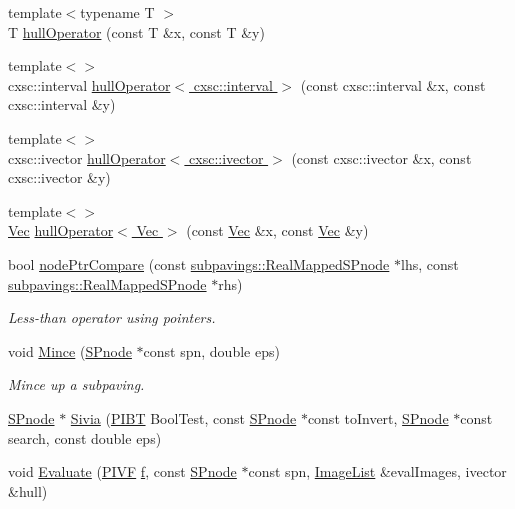 \begin{DoxyCompactItemize}
{\footnotesize template$<$typename T $>$ }\\\-T \hyperlink{namespacesubpavings_a3aaa0e2846fcc501bf57373ab4fcfcb3}{hull\-Operator} (const \-T \&x, const \-T \&y)
\item 
{\footnotesize template$<$$>$ }\\cxsc\-::interval \hyperlink{namespacesubpavings_a70d818982b5c40190ee76257be4f9027}{hull\-Operator$<$ cxsc\-::interval $>$} (const cxsc\-::interval \&x, const cxsc\-::interval \&y)
\item 
{\footnotesize template$<$$>$ }\\cxsc\-::ivector \hyperlink{namespacesubpavings_a6daf9a90fd58f9f6c19e684172661284}{hull\-Operator$<$ cxsc\-::ivector $>$} (const cxsc\-::ivector \&x, const cxsc\-::ivector \&y)
\item 
{\footnotesize template$<$$>$ }\\\hyperlink{classVec}{\-Vec} \hyperlink{namespacesubpavings_a0f22db67f4e7e059f3acff280a8441f8}{hull\-Operator$<$ Vec $>$} (const \hyperlink{classVec}{\-Vec} \&x, const \hyperlink{classVec}{\-Vec} \&y)
\item 
bool \hyperlink{namespacesubpavings_ab16dccf5fd03eee9a6071072432e38bc}{node\-Ptr\-Compare} (const \hyperlink{classsubpavings_1_1RealMappedSPnode}{subpavings\-::\-Real\-Mapped\-S\-Pnode} $\ast$lhs, const \hyperlink{classsubpavings_1_1RealMappedSPnode}{subpavings\-::\-Real\-Mapped\-S\-Pnode} $\ast$rhs)
\begin{DoxyCompactList}\small\item\em \-Less-\/than operator using pointers. \end{DoxyCompactList}\item 
void \hyperlink{namespacesubpavings_a9d7eaadb31b3f9c2a28ad4af1f977a15}{\-Mince} (\hyperlink{classsubpavings_1_1SPnode}{\-S\-Pnode} $\ast$const spn, double eps)
\begin{DoxyCompactList}\small\item\em \-Mince up a subpaving. \end{DoxyCompactList}\item 
\hyperlink{classsubpavings_1_1SPnode}{\-S\-Pnode} $\ast$ \hyperlink{namespacesubpavings_af397899ec8f3bb396271e6b4fea28dea}{\-Sivia} (\hyperlink{namespacesubpavings_a4ca48fac31a3dcc26d5b51b1ee3cd0d9}{\-P\-I\-B\-T} \-Bool\-Test, const \hyperlink{classsubpavings_1_1SPnode}{\-S\-Pnode} $\ast$const to\-Invert, \hyperlink{classsubpavings_1_1SPnode}{\-S\-Pnode} $\ast$const search, const double eps)
\item 
void \hyperlink{namespacesubpavings_aa47cfd8c78e0be2e255006d743ffd214}{\-Evaluate} (\hyperlink{namespacesubpavings_af9ec133810ddce70b48381d444e2ec22}{\-P\-I\-V\-F} \hyperlink{errorfunc_8hpp_aacb77b1211a6ca2e2beff1811cf9ecf4}{f}, const \hyperlink{classsubpavings_1_1SPnode}{\-S\-Pnode} $\ast$const spn, \hyperlink{namespacesubpavings_acf161e8d79f04bf197a33277dd633f6d}{\-Image\-List} \&eval\-Images, ivector \&hull)

\end{DoxyCompactItemize}
